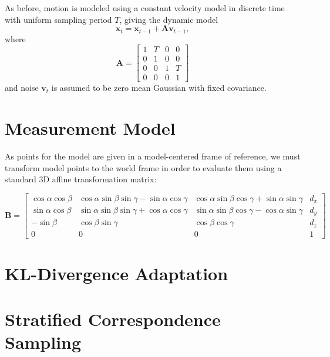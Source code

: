 As before, motion is modeled using a constant velocity model in discrete time with uniform sampling period $\mathit{T}$, giving the dynamic model
\begin{equation} \mathbf{x}_t = \mathbf{x}_{t-1} + \mathbf{A}\mathbf{v}_{t-1} , \end{equation}
where
\begin{equation} \mathbf{A} = 
\begin{bmatrix}
 1 & \mathit{T} & 0  & 0 \\ 
 0 & 1 & 0 & 0\\ 
 0 & 0 & 1 & \mathit{T}\\ 
 0 & 0 & 0 & 1
\end{bmatrix} \end{equation}
and noise $\mathbf{v}_t$ is assumed to be zero mean Gaussian with fixed covariance.

\section{Measurement Model}

As points for the model are given in a model-centered frame of reference, we must transform model points to the world frame in order to evaluate them using a standard 3D affine transformation matrix:

\begin{equation} \mathbf{B} = 
\begin{bmatrix}
 \cos{\alpha}\cos{\beta} & \cos{\alpha}\sin{\beta}\sin{\gamma} - \sin{\alpha}\cos{\gamma} & \cos{\alpha}\sin{\beta}\cos{\gamma} + \sin{\alpha}\sin{\gamma}  & d_x \\ 
\sin{\alpha}\cos{\beta} & \sin{\alpha}\sin{\beta}\sin{\gamma} + \cos{\alpha}\cos{\gamma} & \sin{\alpha}\sin{\beta}\cos{\gamma} - \cos{\alpha}\sin{\gamma}  & d_y \\ 
 -\sin{\beta} & \cos{\beta}\sin{\gamma} & \cos{\beta}\cos{\gamma} & d_z \\ 
 0 & 0 & 0 & 1
\end{bmatrix} \end{equation}


\section{KL-Divergence Adaptation}
\section{Stratified Correspondence Sampling}
